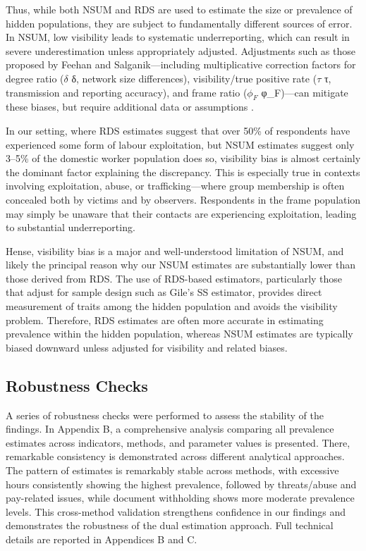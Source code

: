 \documentclass[
  12pt,
  letterpaper,
  DIV=11,
  numbers=noendperiod]{scrartcl}
\theoremstyle{plain}
\theoremstyle{definition}
\begin{document}
Thus, while both NSUM and RDS are used to estimate the size or
prevalence of hidden populations, they are subject to fundamentally
different sources of error. In NSUM, low visibility leads to systematic
underreporting, which can result in severe underestimation unless
appropriately adjusted. Adjustments such as those proposed by Feehan and
Salganik---including multiplicative correction factors for degree ratio
(\(\delta\) δ, network size differences), visibility/true positive rate
(\(\tau\) τ, transmission and reporting accuracy), and frame ratio
(\(\phi_F\) φ\_F)---can mitigate these biases, but require additional
data or assumptions \autocite{feeh16-generalizing}.

In our setting, where RDS estimates suggest that over 50\% of
respondents have experienced some form of labour exploitation, but NSUM
estimates suggest only 3--5\% of the domestic worker population does so,
visibility bias is almost certainly the dominant factor explaining the
discrepancy. This is especially true in contexts involving exploitation,
abuse, or trafficking---where group membership is often concealed both
by victims and by observers. Respondents in the frame population may
simply be unaware that their contacts are experiencing exploitation,
leading to substantial underreporting.

Hense, visibility bias is a major and well-understood limitation of
NSUM, and likely the principal reason why our NSUM estimates are
substantially lower than those derived from RDS. The use of RDS-based
estimators, particularly those that adjust for sample design such as
Gile's SS estimator, provides direct measurement of traits among the
hidden population and avoids the visibility problem. Therefore, RDS
estimates are often more accurate in estimating prevalence within the
hidden population, whereas NSUM estimates are typically biased downward
unless adjusted for visibility and related biases.

\subsection{Robustness Checks}\label{robustness-checks}

A series of robustness checks were performed to assess the stability of
the findings. In Appendix B, a comprehensive analysis comparing all
prevalence estimates across indicators, methods, and parameter values is
presented. There, remarkable consistency is demonstrated across
different analytical approaches. The pattern of estimates is remarkably
stable across methods, with excessive hours consistently showing the
highest prevalence, followed by threats/abuse and pay-related issues,
while document withholding shows more moderate prevalence levels. This
cross-method validation strengthens confidence in our findings and
demonstrates the robustness of the dual estimation approach. Full
technical details are reported in Appendices B and C.
\end{document}
